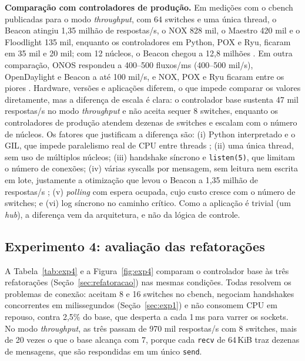 \documentclass[12pt]{article}
\begin{document}
\textbf{Comparação com controladores de produção.} Em medições com o cbench publicadas
para o modo \textit{throughput}, com 64 switches e uma única thread, o Beacon atingiu
1,35 milhão de respostas/s, o NOX 828 mil, o Maestro 420 mil e o Floodlight 135 mil,
enquanto os controladores em Python, POX e Ryu, ficaram em 35 mil e 20 mil; com 12
núcleos, o Beacon chegou a 12,8 milhões \cite{erickson2013beacon}. Em outra comparação,
ONOS respondeu a 400--500 fluxos/ms (400--500 mil/s), OpenDaylight e Beacon a até
100 mil/s, e NOX, POX e Ryu ficaram entre os piores \cite{zhu2019benchmarking}. Hardware, versões e aplicações diferem, o que impede comparar os valores
diretamente, mas a diferença de escala é clara: o controlador base sustenta 47 mil
respostas/s no modo \textit{throughput} e não aceita sequer 8 switches, enquanto os
controladores de produção atendem dezenas de switches e escalam com o número de núcleos.
Os fatores que justificam a diferença são: (i) Python interpretado e o GIL, que impede
paralelismo real de CPU entre threads \cite{beazley2010gil}; (ii) uma única thread, sem
uso de múltiplos núcleos; (iii) handshake síncrono e \texttt{listen(5)}, que limitam o
número de conexões; (iv) várias syscalls por mensagem, sem leitura nem escrita em lote,
justamente a otimização que levou o Beacon a 1,35 milhão de respostas/s
\cite{erickson2013beacon}; (v) \textit{polling} com espera ocupada, cujo custo cresce
com o número de switches; e (vi) log síncrono no caminho crítico. Como a aplicação é
trivial (um \textit{hub}), a diferença vem da arquitetura, e não da lógica de controle.

\subsection{Experimento 4: avaliação das refatorações}
\label{sec:exp4}
A Tabela~\ref{tab:exp4} e a Figura~\ref{fig:exp4} comparam o controlador base às três
refatorações (Seção~\ref{sec:refatoracao}) nas mesmas condições. Todas resolvem os
problemas de conexão: aceitam 8 e 16 switches no cbench, negociam handshakes
concorrentes em milissegundos (Seção~\ref{sec:exp1}) e não consomem CPU em repouso,
contra 2,5\% do base, que desperta a cada 1\,ms para varrer os sockets. No modo
\textit{throughput}, as três passam de 970 mil respostas/s com 8 switches, mais de 20
vezes o que o base alcança com 7, porque cada \texttt{recv} de 64\,KiB traz dezenas de
mensagens, que são respondidas em um único \texttt{send}.
\end{document}
